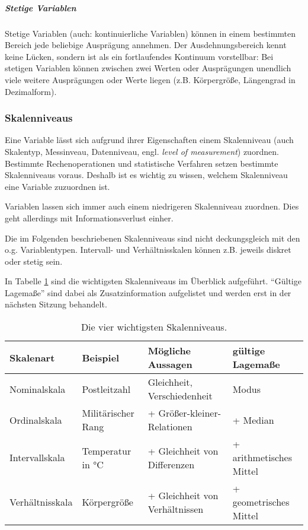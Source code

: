 \documentclass[
  ngerman,
]{article}
\begin{document}
\hypertarget{stetige-variablen}{%
\subparagraph{Stetige Variablen}\label{stetige-variablen}}

Stetige Variablen (auch: kontinuierliche Variablen) können in einem bestimmten Bereich jede beliebige Ausprägung annehmen. Der Ausdehnungsbereich kennt keine Lücken, sondern ist als ein fortlaufendes Kontinuum vorstellbar: Bei stetigen Variablen können zwischen zwei Werten oder Ausprägungen unendlich viele weitere Ausprägungen oder Werte liegen (z.B. Körpergröße, Längengrad in Dezimalform).

\hypertarget{skalenniveaus}{%
\subsubsection{Skalenniveaus}\label{skalenniveaus}}

Eine Variable lässt sich aufgrund ihrer Eigenschaften einem Skalenniveau (auch Skalentyp, Messinveau, Datenniveau, engl. \emph{level of measurement}) zuordnen. Bestimmte Rechenoperationen und statistische Verfahren setzen bestimmte Skalenniveaus voraus. Deshalb ist es wichtig zu wissen, welchem Skalenniveau eine Variable zuzuordnen ist.

Variablen lassen sich immer auch einem niedrigeren Skalenniveau zuordnen. Dies geht allerdings mit Informationsverlust einher.

Die im Folgenden beschriebenen Skalenniveaus sind nicht deckungsgleich mit den o.g. Variablentypen. Intervall- und Verhältnisskalen können z.B. jeweils diskret oder stetig sein.

In Tabelle \ref{tab:skalen} sind die wichtigsten Skalenniveaus im Überblick aufgeführt. ``Gültige Lagemaße'' sind dabei als Zusatzinformation aufgelistet und werden erst in der nächsten Sitzung behandelt.

\begin{table}

\caption{\label{tab:skalen}Die vier wichtigsten Skalenniveaus.}
\centering
\begin{tabular}[t]{llll}
\toprule
Skalenart & Beispiel & Mögliche Aussagen & gültige Lagemaße\\
\midrule
Nominalskala & Postleitzahl & Gleichheit, Verschiedenheit & Modus\\
Ordinalskala & Militärischer Rang & + Größer-kleiner-Relationen & + Median\\
Intervallskala & Temperatur in °C & + Gleichheit von Differenzen & + arithmetisches Mittel\\
Verhältnisskala & Körpergröße & + Gleichheit von Verhältnissen & + geometrisches Mittel\\
\bottomrule
\end{tabular}
\end{table}
\end{document}
